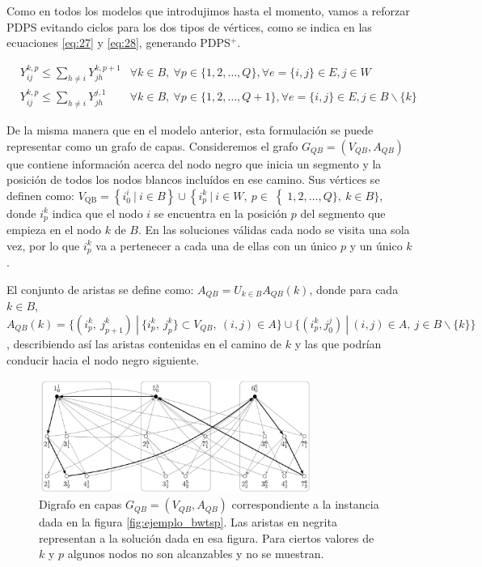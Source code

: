 \documentclass[10pt, a4paper]{article}
\theoremstyle{definition}
\begin{document}
Como en todos los modelos que introdujimos hasta el momento, vamos a reforzar PDPS evitando ciclos para los dos tipos de vértices, como se indica en las ecuaciones \ref{eq:27} y \ref{eq:28}, generando PDPS$^{+}$.

\begin{align}
	& Y_{i j}^{k, p} \leq \sum_{h \neq i} Y_{j h}^{k, p+1} & \forall k \in B,\ \forall p \in\{1,2, \ldots, Q\}, \forall e=\{i, j\} \in E, j \in W \label{eq:27} \\
	& Y_{i j}^{k, p} \leq \sum_{h \neq i} Y_{j h}^{j, 1} & \forall k \in B,\ \forall p \in\{1,2, \ldots, Q+1\}, \forall e=\{i, j\} \in E, j \in B \backslash\{k\} \label{eq:28}
\end{align}

De la misma manera que en el modelo anterior, esta formulación se puede representar como un grafo de capas. Consideremos el grafo $G_{Q B}=\left(V_{Q B}, A_{Q B}\right)$ que contiene información acerca del nodo negro que inicia un segmento y la posición de todos los nodos blancos incluídos en ese camino. Sus vértices se definen como: $V_{\mathrm{QB}}=\left\{i_{0}^{i}\ |\ i \in B\right\} \cup\left\{i_{p}^{k}\ |\ i \in W,\ p \in\right \{1,2, \ldots, Q\},\ k \in B \}$, donde $i_{p}^{k}$ indica que el nodo $i$ se encuentra en la posición $p$ del segmento que empieza en el nodo $k$ de $B$. En las soluciones válidas cada nodo se visita una sola vez, por lo que $i_{p}^{k}$ va a pertenecer a cada una de ellas con un único $p$ y un único $k$.

El conjunto de aristas se define como: $A_{Q B} = U_{k \in B} A_{Q B}(k)$, donde para cada $k \in B$, $A_{Q B}(k)=\{(i_{p}^{k},\ j_{p+1}^{k})\ |\ \{i_{p}^{k},\ j_{p}^{k}\} \subset V_{Q B},\ (i, j) \in A\} \cup\{(i_{p}^{k}, j_{0}^{j})\ |\ (i, j) \in A,\ j \in B \backslash\{k\} \}$, describiendo así las aristas contenidas en el camino de $k$ y las que podrían conducir hacia el nodo negro siguiente.

\begin{figure}[H]
  \centering
  \includegraphics[width=0.8\textwidth]{ejemplo_capas_qb.png}
  \caption{Digrafo en capas $G_{Q B}=\left(V_{Q B}, A_{Q B}\right)$ correspondiente a la instancia dada en la figura \ref{fig:ejemplo_bwtsp}. Las aristas en negrita representan a la solución dada en esa figura. Para ciertos valores de $k$ y $p$ algunos nodos no son alcanzables y no se muestran.}
  \label{fig:ejemplo_capas_qb}
\end{figure}
\end{document}
